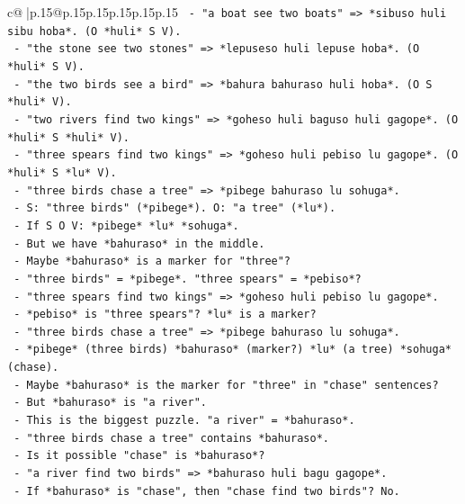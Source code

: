 \documentclass{article}
\begin{document}
{\begin{supertabular}{c@{$\;$}|p{.15\linewidth}@{}p{.15\linewidth}p{.15\linewidth}p{.15\linewidth}p{.15\linewidth}p{.15\linewidth}}
{{{\texttt{        {-} "a boat see two boats" => *sibuso huli sibu hoba*. (O *huli* S V).} \\
\texttt{        {-} "the stone see two stones" => *lepuseso huli lepuse hoba*. (O *huli* S V).} \\
\texttt{        {-} "the two birds see a bird" => *bahura bahuraso huli hoba*. (O S *huli* V).} \\
\texttt{        {-} "two rivers find two kings" => *goheso huli baguso huli gagope*. (O *huli* S *huli* V).} \\
\texttt{        {-} "three spears find two kings" => *goheso huli pebiso lu gagope*. (O *huli* S *lu* V).} \\
\texttt{        {-} "three birds chase a tree" => *pibege bahuraso lu sohuga*.} \\
\texttt{          {-} S: "three birds" (*pibege*). O: "a tree" (*lu*).} \\
\texttt{          {-} If S O V: *pibege* *lu* *sohuga*.} \\
\texttt{          {-} But we have *bahuraso* in the middle.} \\
\texttt{          {-} Maybe *bahuraso* is a marker for "three"?} \\
\texttt{          {-} "three birds" = *pibege*. "three spears" = *pebiso*?} \\
\texttt{          {-} "three spears find two kings" => *goheso huli pebiso lu gagope*.} \\
\texttt{          {-} *pebiso* is "three spears"? *lu* is a marker?} \\
\texttt{          {-} "three birds chase a tree" => *pibege bahuraso lu sohuga*.} \\
\texttt{          {-} *pibege* (three birds) *bahuraso* (marker?) *lu* (a tree) *sohuga* (chase).} \\
\texttt{          {-} Maybe *bahuraso* is the marker for "three" in "chase" sentences?} \\
\texttt{          {-} But *bahuraso* is "a river".} \\
\texttt{          {-} This is the biggest puzzle. "a river" = *bahuraso*.} \\
\texttt{          {-} "three birds chase a tree" contains *bahuraso*.} \\
\texttt{          {-} Is it possible "chase" is *bahuraso*?} \\
\texttt{          {-} "a river find two birds" => *bahuraso huli bagu gagope*.} \\
\texttt{          {-} If *bahuraso* is "chase", then "chase find two birds"? No.} \\
}}}
\end{supertabular}}
\end{document}
